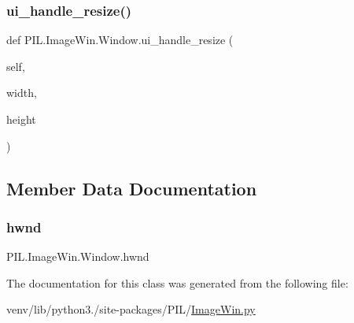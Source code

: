 \subsubsection{\texorpdfstring{ui\+\_\+handle\+\_\+resize()}{ui\_handle\_resize()}}
{\footnotesize\ttfamily def P\+I\+L.\+Image\+Win.\+Window.\+ui\+\_\+handle\+\_\+resize (\begin{DoxyParamCaption}\item[{}]{self,  }\item[{}]{width,  }\item[{}]{height }\end{DoxyParamCaption})}



\subsection{Member Data Documentation}
\mbox{\label{classPIL_1_1ImageWin_1_1Window_a61e2885c93c2274b34379b2c2995bbb8}} 
\subsubsection{\texorpdfstring{hwnd}{hwnd}}
{\footnotesize\ttfamily P\+I\+L.\+Image\+Win.\+Window.\+hwnd}



The documentation for this class was generated from the following file\+:\begin{DoxyCompactItemize}
\item 
venv/lib/python3./site-\/packages/\+P\+I\+L/\hyperlink{ImageWin_8py}{Image\+Win.\+py}\end{DoxyCompactItemize}
